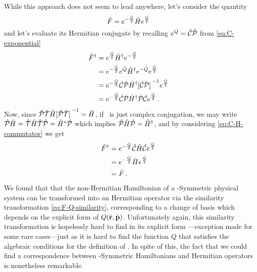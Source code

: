             While this approach does not seem to lead anywhere, let's consider the quantity
            \begin{equation}
                \label{eq:F-Q-similarity}
                \hat{F} = e^{-\frac{\hat{Q}}{2}}\hat{H}e^{\frac{\hat{Q}}{2}}
            \end{equation}
            and let's evaluate its Hermitian conjugate by recalling $e^{Q} = \mathcal{\hat{C}}\mathcal{\hat{P}}$ from \eqref{eq:C-exponential}
            \begin{align*}
                \hF^\dag
                &= \myexp{\frac{\hQ}{2}} \hH^\dag \myexp{-\frac{\hQ}{2}} \\
                &= \myexp{-\frac{\hQ}{2}} \myexp{\hQ} \hH^\dag \myexp{-\hQ} \myexp{\frac{\hQ}{2}} \\
                &= \myexp{-\frac{\hQ}{2}} \hC\hP \hH^\dag \bqty*{\hC\hP}^{-1} \myexp{\frac{\hQ}{2}} \\
                &= \myexp{-\frac{\hQ}{2}} \hC\hP \hH^\dag \hP\hC \myexp{\frac{\hQ}{2}}
                \myperiod
            \end{align*}
            Now, since $\PTtransform{\hH} = \hH$, if \hT\ is just complex conjugation, we may write $\mathcal{\hat{P}}\hat{H} = \mathcal{\hat{T}}\hat{H}\mathcal{\hat{T}}\mathcal{\hat{P}} = \hat{H}^*\mathcal{\hat{P}}$ which implies $\mathcal{\hat{P}}\hat{H}\mathcal{\hat{P}} = \hat{H}^\dag$, and by considering \eqref{eq:C-H-commutator} we get \cite{bender2024}
            \begin{align*}
                \hat{F}^\dag 
                &= e^{-\frac{\hat{Q}}{2}} \mathcal{\hat{C}} \hat{H} \mathcal{\hat{C}} e^{\frac{\hat{Q}}{2}} \\
                &= e^{-\frac{\hat{Q}}{2}} \hat{H} e^{\frac{\hat{Q}}{2}} \\
                &= \hat{F}
                \,\text{.}
            \end{align*}
            We found that that the non-Hermitian Hamiltonian of a \PT-Symmetric physical system can be transformed into an Hermitian operator via the similarity transformation \eqref{eq:F-Q-similarity}, corresponding to a change of basis which depends on the explicit form of $Q\pqty{\hvr,\hvp}$. Unfortunately again, this similarity transformation is hopelessly hard to find in its explicit form \cite{bender2024}---exception made for some rare cases---just as it is hard to find the function $Q$ that satisfies the algebraic conditions for the definition of \hC. In spite of this, the fact that we could find a correspondence between \PT-Symmetric Hamiltonians and Hermitian operators is nonetheless remarkable.
            
